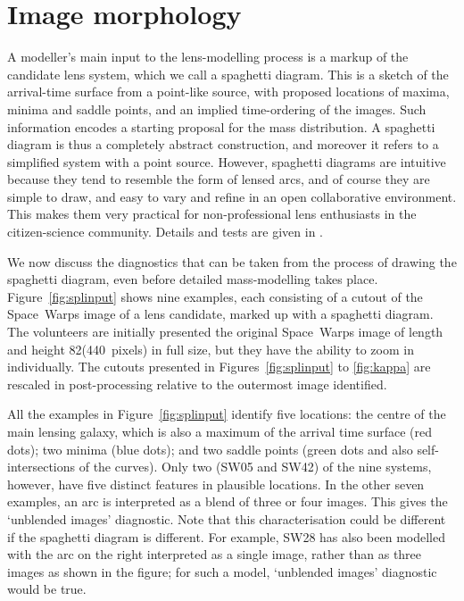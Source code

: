 
\section{Image morphology}
\label{sec:morph}

A modeller's main input to the lens-modelling process is a markup of
the candidate lens system, which we call a spaghetti diagram.
This is a sketch of the arrival-time surface from a point-like source,
with proposed locations of maxima, minima and saddle points, and an
implied time-ordering of the images.  Such information encodes a
starting proposal for the mass distribution.  A spaghetti diagram is
thus a completely abstract construction, and moreover it refers to a
simplified system with a point source.  However, spaghetti diagrams
are intuitive because they tend to resemble the form of lensed arcs,
and of course they are simple to draw, and easy to vary and refine in
an open collaborative environment.  This makes them very practical for
non-professional lens enthusiasts in the citizen-science community.
Details and tests are given in \cite{2015MNRAS.447.2170K}.

We now discuss the diagnostics that can be taken from the process of
drawing the spaghetti diagram, even before detailed mass-modelling
takes place.  Figure~\ref{fig:splinput} shows nine examples, each
consisting of a cutout of the Space~Warps image of a lens candidate,
marked up with a spaghetti diagram.
The volunteers are initially presented the original Space~Warps image of
length and height 82\arcsec (440~pixels) in full size, but they have the
ability to zoom in individually.
The cutouts presented in Figures~\ref{fig:splinput} to \ref{fig:kappa}
are rescaled in post-processing relative to the outermost image identified.

All the examples in Figure~\ref{fig:splinput} identify five locations:
the centre of the main lensing galaxy, which is also a maximum of the
arrival time surface (red dots); two minima (blue dots); and two
saddle points (green dots and also self-intersections of the curves).
Only two (SW05 and SW42) of the nine systems, however, have five
distinct features in plausible locations.  In the other seven
examples, an arc is interpreted as a blend of three or four images.
This gives the `unblended images' diagnostic.  Note that this
characterisation could be different if the spaghetti diagram is
different.  For example, SW28 has also been modelled with the arc on
the right interpreted as a single image, rather than as three images
as shown in the figure; for such a model, `unblended images'
diagnostic would be true.


